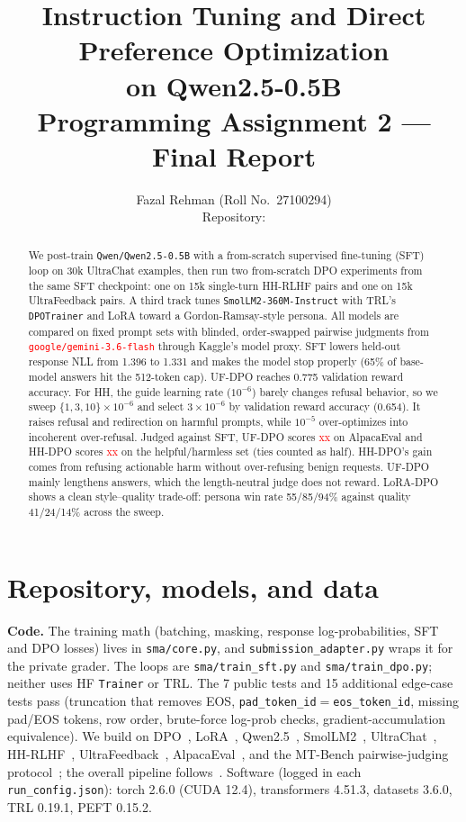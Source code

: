 \documentclass[10pt]{article}
\title{\vspace{-1.2cm}\textbf{Instruction Tuning and Direct Preference Optimization\\on Qwen2.5-0.5B}\\[2pt]
\large Programming Assignment 2 --- Final Report}
\author{Fazal Rehman \quad (Roll No.\ 27100294)\\ \small Repository: \RepoURL}
\date{}
\newcommand{\res}[1]{\textcolor{red}{#1}}
\providecommand{\JudgeModel}{\res{\texttt{google/gemini-3.6-flash}}}
\providecommand{\ResUFwin}{\res{xx}}
\providecommand{\ResHHwin}{\res{xx}}
\newcommand{\code}[1]{\texttt{\small #1}}
\begin{document}
\maketitle
\vspace{-0.8cm}

\begin{abstract}
\noindent We post-train \code{Qwen/Qwen2.5-0.5B} with a from-scratch supervised fine-tuning (SFT) loop on 30k
UltraChat examples, then run two from-scratch DPO experiments from the same SFT checkpoint: one on 15k single-turn
HH-RLHF pairs and one on 15k UltraFeedback pairs. A third track tunes \code{SmolLM2-360M-Instruct} with TRL's
\code{DPOTrainer} and LoRA toward a Gordon-Ramsay-style persona. All models are compared on fixed prompt sets with
blinded, order-swapped pairwise judgments from \JudgeModel{} through Kaggle's model proxy.
SFT lowers held-out response NLL from 1.396 to 1.331 and makes the model stop properly (65\% of base-model answers hit the
512-token cap). UF-DPO reaches 0.775 validation reward accuracy. For HH, the guide learning rate ($10^{-6}$) barely changes
refusal behavior, so we sweep $\{1,3,10\}\times10^{-6}$ and select $3\times10^{-6}$ by validation reward accuracy (0.654). It
raises refusal and redirection on harmful prompts, while $10^{-5}$ over-optimizes into incoherent over-refusal. Judged against SFT,
UF-DPO scores \ResUFwin{} on AlpacaEval and HH-DPO scores \ResHHwin{} on the helpful/harmless set (ties counted as half).
HH-DPO's gain comes from refusing actionable harm without over-refusing benign requests. UF-DPO mainly lengthens answers, which
the length-neutral judge does not reward. LoRA-DPO shows a clean style--quality trade-off: persona win rate 55/85/94\% against quality
41/24/14\% across the sweep.
\end{abstract}

\section{Repository, models, and data}
\textbf{Code.} The training math (batching, masking, response log-probabilities, SFT and DPO losses) lives in
\code{sma/core.py}, and \code{submission\_adapter.py} wraps it for the private grader. The loops are
\code{sma/train\_sft.py} and \code{sma/train\_dpo.py}; neither uses HF \code{Trainer} or TRL. The 7 public tests and 15 additional
edge-case tests pass (truncation that removes EOS, \code{pad\_token\_id}$=$\code{eos\_token\_id}, missing pad/EOS
tokens, row order, brute-force log-prob checks, gradient-accumulation equivalence). We build on DPO~\cite{dpo}, LoRA~\cite{lora}, Qwen2.5~\cite{qwen}, SmolLM2~\cite{smol}, UltraChat~\cite{uc}, HH-RLHF~\cite{hh},
UltraFeedback~\cite{uf}, AlpacaEval~\cite{ae,lc}, and the MT-Bench pairwise-judging protocol~\cite{mt}; the overall pipeline follows~\cite{ig}.
Software (logged in each \code{run\_config.json}): torch 2.6.0 (CUDA 12.4), transformers 4.51.3, datasets 3.6.0, TRL 0.19.1, PEFT 0.15.2.
\end{document}
